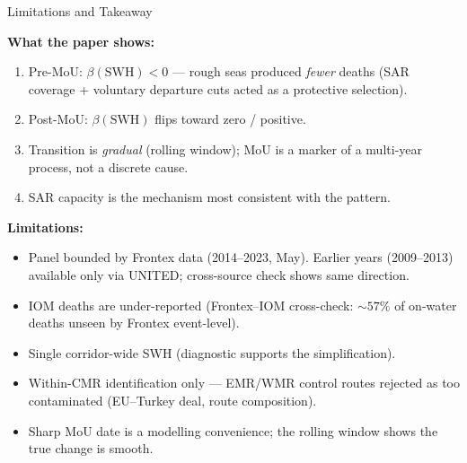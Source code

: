 \documentclass[aspectratio=169,10pt]{beamer}
\begin{document}
\begin{frame}{Limitations and Takeaway}

\textbf{What the paper shows:}
\begin{enumerate}
  \item Pre-MoU: $\beta(\text{SWH}) < 0$ --- rough seas produced \emph{fewer} deaths
    (SAR coverage + voluntary departure cuts acted as a protective selection).
  \item Post-MoU: $\beta(\text{SWH})$ flips toward zero / positive.
  \item Transition is \emph{gradual} (rolling window); MoU is a marker of a
    multi-year process, not a discrete cause.
  \item SAR capacity is the mechanism most consistent with the pattern.
\end{enumerate}

\vspace{0.5em}
\textbf{Limitations:}
\begin{itemize}
  \item Panel bounded by Frontex data (2014--2023, May). Earlier years (2009--2013)
    available only via UNITED; cross-source check shows same direction.
  \item IOM deaths are under-reported (Frontex--IOM cross-check:
    $\sim\!57\%$ of on-water deaths unseen by Frontex event-level).
  \item Single corridor-wide SWH (diagnostic supports the simplification).
  \item Within-CMR identification only --- EMR/WMR control routes rejected as
    too contaminated (EU--Turkey deal, route composition).
  \item Sharp MoU date is a modelling convenience; the rolling window shows the
    true change is smooth.
\end{itemize}
\end{frame}
\end{document}
